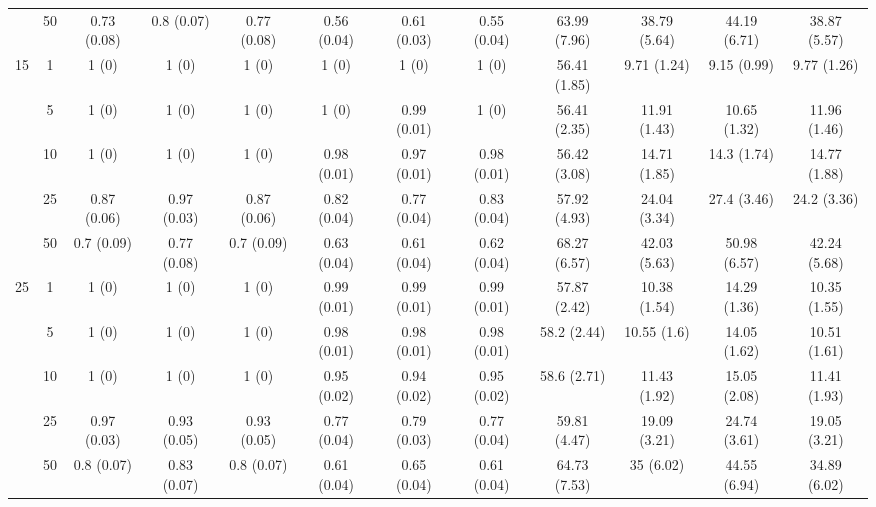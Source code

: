 \documentclass[10pt]{article}
\theoremstyle{definition}
\begin{document}
\begin{table}[H]
\begin{center}
{\begin{tabular}{cc|ccc|ccc|cccc|}
    & 50   & 0.73 (0.08) & 0.8 (0.07) & 0.77 (0.08) & 0.56 (0.04) & 0.61 (0.03) & 0.55 (0.04) & 63.99 (7.96) & 38.79 (5.64) & 44.19 (6.71) & 38.87 (5.57) \\[.3cm] 
  \multirow{5}{*}{15} & 1   & 1 (0) & 1 (0) & 1 (0) & 1 (0) & 1 (0) & 1 (0) & 56.41 (1.85) & 9.71 (1.24) & 9.15 (0.99) & 9.77 (1.26) \\ 
    & 5   & 1 (0) & 1 (0) & 1 (0) & 1 (0) & 0.99 (0.01) & 1 (0) & 56.41 (2.35) & 11.91 (1.43) & 10.65 (1.32) & 11.96 (1.46) \\ 
    & 10   & 1 (0) & 1 (0) & 1 (0) & 0.98 (0.01) & 0.97 (0.01) & 0.98 (0.01) & 56.42 (3.08) & 14.71 (1.85) & 14.3 (1.74) & 14.77 (1.88) \\ 
    & 25   & 0.87 (0.06) & 0.97 (0.03) & 0.87 (0.06) & 0.82 (0.04) & 0.77 (0.04) & 0.83 (0.04) & 57.92 (4.93) & 24.04 (3.34) & 27.4 (3.46) & 24.2 (3.36) \\ 
    & 50   & 0.7 (0.09) & 0.77 (0.08) & 0.7 (0.09) & 0.63 (0.04) & 0.61 (0.04) & 0.62 (0.04) & 68.27 (6.57) & 42.03 (5.63) & 50.98 (6.57) & 42.24 (5.68) \\[.3cm] 
    \multirow{5}{*}{25} & 1   & 1 (0) & 1 (0) & 1 (0) & 0.99 (0.01) & 0.99 (0.01) & 0.99 (0.01) & 57.87 (2.42) & 10.38 (1.54) & 14.29 (1.36) & 10.35 (1.55) \\ 
  & 5   & 1 (0) & 1 (0) & 1 (0) & 0.98 (0.01) & 0.98 (0.01) & 0.98 (0.01) & 58.2 (2.44) & 10.55 (1.6) & 14.05 (1.62) & 10.51 (1.61) \\ 
  & 10   & 1 (0) & 1 (0) & 1 (0) & 0.95 (0.02) & 0.94 (0.02) & 0.95 (0.02) & 58.6 (2.71) & 11.43 (1.92) & 15.05 (2.08) & 11.41 (1.93) \\ 
   & 25   & 0.97 (0.03) & 0.93 (0.05) & 0.93 (0.05) & 0.77 (0.04) & 0.79 (0.03) & 0.77 (0.04) & 59.81 (4.47) & 19.09 (3.21) & 24.74 (3.61) & 19.05 (3.21) \\ 
    & 50   & 0.8 (0.07) & 0.83 (0.07) & 0.8 (0.07) & 0.61 (0.04) & 0.65 (0.04) & 0.61 (0.04) & 64.73 (7.53) & 35 (6.02) & 44.55 (6.94) & 34.89 (6.02) \\
\end{tabular}}
   \end{center}
      \vspace{-.5cm}
\end{table}
\end{document}
